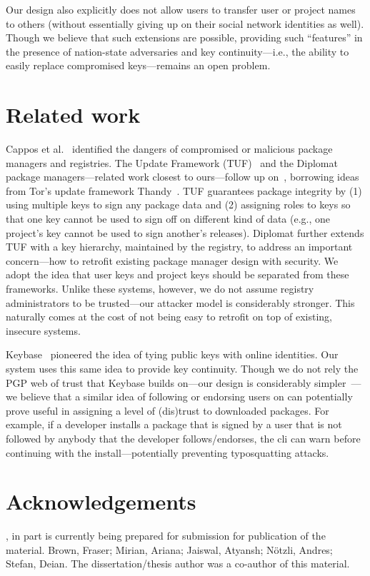 Our design also explicitly does not allow users to transfer user or project
names to others (without essentially giving up on their social network
identities as well).
%
Though we believe that such extensions are possible, providing such
``features'' in the presence of nation-state adversaries and key
continuity---i.e., the ability to easily replace compromised keys---remains an
open problem.


\section{Related work}
\label{sec:related}

%
Cappos et al.~\cite{cappos:look} identified the dangers of compromised or
malicious package managers and registries.
%
The Update Framework (TUF)~\cite{samuel2010survivable} and the
Diplomat~\cite{kuppusamy2016diplomat} package managers---related work closest
to ours---follow up on~\cite{cappos:look}, borrowing ideas from Tor's update
framework Thandy~\cite{thandy}.
%
TUF guarantees package integrity by (1) using multiple keys to sign any package
data and (2) assigning roles to keys so that one key cannot be used to sign off
on different kind of data (e.g., one project's key cannot be used to sign
another's releases).
%
Diplomat further extends TUF with a key hierarchy, maintained by the registry,
to address an important concern---how to retrofit existing package manager
design with security.
%
We adopt the idea that user keys and project keys should be separated from
these frameworks.
%
Unlike these systems, however, we do not assume registry administrators to be
trusted---our attacker model is considerably stronger.
%
This naturally comes at the cost of not being easy to retrofit on top of
existing, insecure systems.

Keybase~\cite{keybase} pioneered the idea of tying public keys with online
identities.
%
Our system uses this same idea to provide key continuity.
%
Though we do not rely the PGP web of trust that Keybase builds on---our design
is considerably simpler~\cite{openbsd}---we believe that a similar idea of
following or endorsing users on \spam can potentially prove useful in assigning
a level of (dis)trust to downloaded packages.
%
For example, if a developer installs a package that is signed by a user that is
not followed by anybody that the developer follows/endorses, the \spam cli can
warn before continuing with the install---potentially preventing typosquatting
attacks.

\section{Acknowledgements}
\label{sec:acknowledgement-spam}
, in part is currently being prepared for submission for
publication of the material. Brown, Fraser; Mirian, Ariana; Jaiswal, Atyansh;
N\"otzli, Andres; Stefan, Deian. The dissertation/thesis author was a
co-author of this material.
